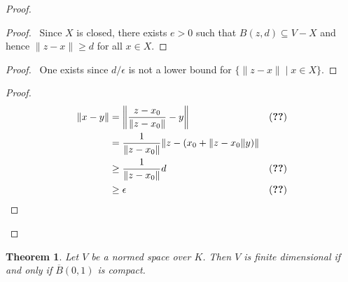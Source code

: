 \documentclass{book}
\let\qed\relax
\newtheorem{thm}[ax]{Theorem}
\theoremstyle{definition}
\begin{document}
\begin{proof}
\pf
{}
\begin{proof}
	\pf\ Since $X$ is closed, there exists $e > 0$ such that $B(z,d) \subseteq V - X$ and hence $\|z-x\| \geq d$ for all $x \in X$.
\end{proof}
\begin{proof}
	\pf\ One exists since $d / \epsilon$ is not a lower bound for $\{ \| z - x \| \mid x \in X \}$.
\end{proof}
\begin{proof}
	\pf
	\begin{align*}
		\|x-y\| & = \left\| \frac{z-x_0}{\|z-x_0\|} - y \right\| & (\text{\stepref{5}}) \\
		& = \frac{1}{\|z - x_0\|} \| z - (x_0 + \|z - x_0\|y) \| \\
		& \geq \frac{1}{\|z - x_0\|} d & (\text{\stepref{2}}) \\
		& \geq \epsilon & (\text{\stepref{4}})
	\end{align*}
\end{proof}
\qed
\end{proof}

\begin{thm}
Let $V$ be a normed space over $K$. Then $V$ is finite dimensional if and only if $\overline{B}(0,1)$ is compact.
\end{thm}
\end{document}
